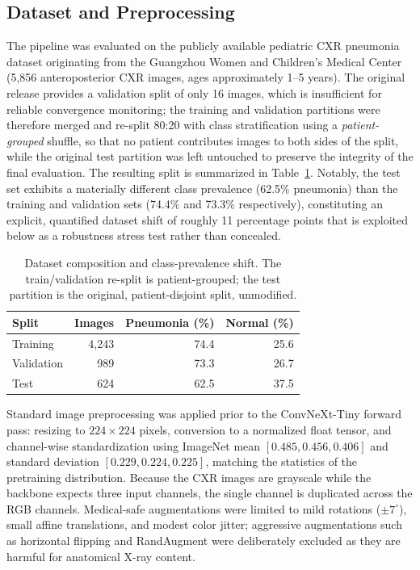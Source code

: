 \documentclass[11pt,a4paper]{article}
\begin{document}
\subsection{Dataset and Preprocessing}

The pipeline was evaluated on the publicly available pediatric CXR pneumonia
dataset originating from the Guangzhou Women and Children's Medical Center
(5{,}856 anteroposterior CXR images, ages approximately 1--5 years).  The
original release provides a validation split of only 16 images, which is
insufficient for reliable convergence monitoring; the training and validation
partitions were therefore merged and re-split 80:20 with class stratification
using a \emph{patient-grouped} shuffle, so that no patient contributes images
to both sides of the split, while the original test partition was left
untouched to preserve the integrity of the final evaluation.  The resulting
split is summarized in Table~\ref{tab:dataset}.  Notably, the test set exhibits
a materially different class prevalence (62.5\% pneumonia) than the training
and validation sets (74.4\% and 73.3\% respectively), constituting an explicit,
quantified dataset shift of roughly 11 percentage points that is exploited
below as a robustness stress test rather than concealed.

\begin{table}[htbp]
\centering
\caption{Dataset composition and class-prevalence shift.  The train/validation
  re-split is patient-grouped; the test partition is the original,
  patient-disjoint split, unmodified.}
\label{tab:dataset}
\begin{tabular}{@{}lrrr@{}}
\toprule
Split & Images & Pneumonia (\%) & Normal (\%) \\
\midrule
Training   & 4{,}243 & 74.4 & 25.6 \\
Validation &   989 & 73.3 & 26.7 \\
Test       &   624 & 62.5 & 37.5 \\
\bottomrule
\end{tabular}
\end{table}

Standard image preprocessing was applied prior to the ConvNeXt-Tiny forward
pass: resizing to $224\times224$ pixels, conversion to a normalized float
tensor, and channel-wise standardization using ImageNet mean $[0.485, 0.456,
0.406]$ and standard deviation $[0.229, 0.224, 0.225]$, matching the
statistics of the pretraining distribution.  Because the CXR images are
grayscale while the backbone expects three input channels, the single
channel is duplicated across the RGB channels.  Medical-safe augmentations
were limited to mild rotations ($\pm 7^\circ$), small affine translations,
and modest color jitter; aggressive augmentations such as horizontal flipping
and RandAugment were deliberately excluded as they are harmful for
anatomical X-ray content.
\end{document}
